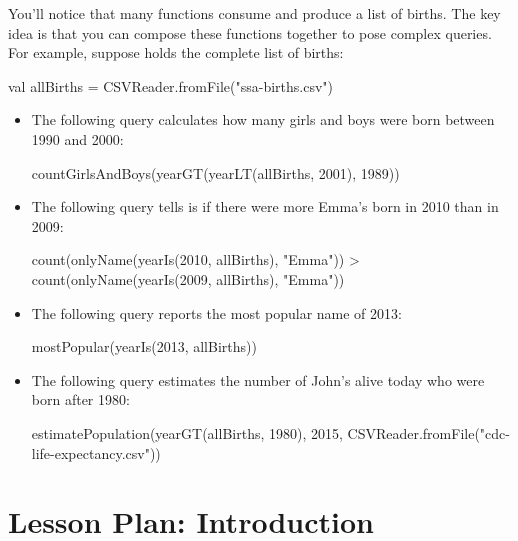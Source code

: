 \documentclass[9pt]{extbook}
\begin{document}
You'll notice that many functions
consume and produce a list of births. The key idea is that you can
compose these functions together to pose complex queries. For example,
suppose  holds the complete list of births:

\begin{scalacode}
val allBirths = CSVReader.fromFile("ssa-births.csv")
\end{scalacode}

\begin{itemize}

  \item The following query calculates how many girls and boys were born between 1990
  and 2000:

  \begin{scalacode}
  countGirlsAndBoys(yearGT(yearLT(allBirths, 2001), 1989))
  \end{scalacode}

  \item The following query tells is if there were more Emma's born in 2010 than
  in 2009:

  \begin{scalacode}
  count(onlyName(yearIs(2010, allBirths), "Emma")) > count(onlyName(yearIs(2009, allBirths), "Emma"))
  \end{scalacode}

  \item The following query reports the most popular name of 2013:

  \begin{scalacode}
  mostPopular(yearIs(2013, allBirths))
  \end{scalacode}

  \item The following query estimates the number of John's alive today who
  were born after 1980:

  \begin{scalacode}
  estimatePopulation(yearGT(allBirths, 1980), 2015, CSVReader.fromFile("cdc-life-expectancy.csv"))
  \end{scalacode}

\end{itemize}




\appendix

\chapter{Lesson Plan: Introduction}
\end{document}

